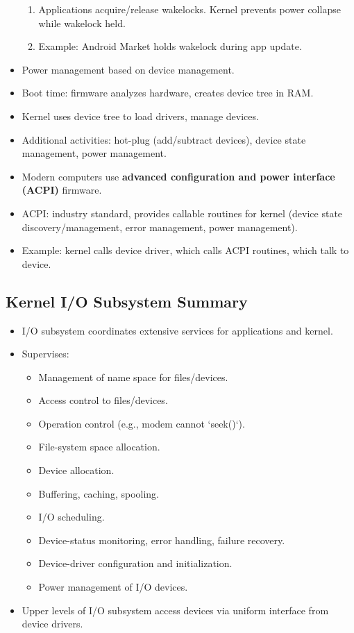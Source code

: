 \begin{itemize}
\begin{enumerate}
        \item Applications acquire/release wakelocks. Kernel prevents power collapse while wakelock held.
        \item Example: Android Market holds wakelock during app update.
    \end{enumerate}
    \item Power management based on device management.
    \item Boot time: firmware analyzes hardware, creates device tree in RAM.
    \item Kernel uses device tree to load drivers, manage devices.
    \item Additional activities: hot-plug (add/subtract devices), device state management, power management.
    \item Modern computers use \textbf{advanced configuration and power interface (ACPI)} firmware.
    \item ACPI: industry standard, provides callable routines for kernel (device state discovery/management, error management, power management).
    \item Example: kernel calls device driver, which calls ACPI routines, which talk to device.
\end{itemize}

\subsection{Kernel I/O Subsystem Summary}
\begin{itemize}
    \item I/O subsystem coordinates extensive services for applications and kernel.
    \item Supervises:
    \begin{itemize}
        \item Management of name space for files/devices.
        \item Access control to files/devices.
        \item Operation control (e.g., modem cannot `seek()`).
        \item File-system space allocation.
        \item Device allocation.
        \item Buffering, caching, spooling.
        \item I/O scheduling.
        \item Device-status monitoring, error handling, failure recovery.
        \item Device-driver configuration and initialization.
        \item Power management of I/O devices.
    \end{itemize}
    \item Upper levels of I/O subsystem access devices via uniform interface from device drivers.
\end{itemize}


